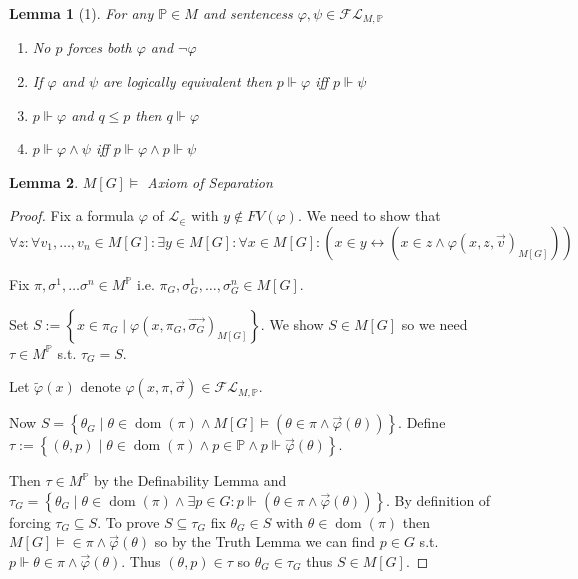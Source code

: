 \documentclass{scrartcl}
\renewcommand{\L}{\mathcal{L}}
\newcommand{\Le}{\L_\in}
\newcommand{\set}[1]{\left\{#1\right\}}
\DeclareMathOperator{\dom}{dom}
\theoremstyle{definition}
\theoremstyle{plain}
\newtheorem*{lemma*}{Lemma}
\theoremstyle{remark}
\begin{document}
	\begin{lemma*}[1]
		For any $\mathbb{P} \in M$ and sentencess  $\varphi, \psi \in \mathcal{FL}_{M, \mathbb{P}}$
		\begin{enumerate}
			\item No $p$ forces both $\varphi$ and $\lnot \varphi$

			\item If $\varphi$ and $\psi$ are logically equivalent then $p \Vdash \varphi$ iff $p \Vdash \psi$
			
			\item $p \Vdash \varphi$ and $q \leq p$ then $q \Vdash \varphi$

			\item $p \Vdash \varphi \land \psi$ iff $p \Vdash \varphi \land p \Vdash \psi$
		\end{enumerate}
	\end{lemma*}

	\begin{lemma*}
		$M[G] \vDash $ Axiom of Separation
	\end{lemma*}

	\begin{proof}
		Fix a formula $\varphi$ of $\Le$ with $y \notin FV(\varphi)$. We need to show that $\forall z: \forall v_1, \dots, v_n \in M[G]: \exists y \in M[G]: \forall x \in M[G]: 
		(x \in y \leftrightarrow (x \in z \land \varphi(x, z, \vec{v})_{M[G]}))$ 

		Fix $\pi, \sigma^1, \dots \sigma^n \in M^\mathbb{P}$  i.e. $\pi_G, \sigma_G^1, \dots, \sigma_G^n \in M[G]$.

		Set $S:= \set{x \in \pi_G \mid \varphi(x, \pi_G, \vec{\sigma_G})_{M[G]}}$. We
		show $S \in M[G]$ so we need $\tau \in M^\mathbb{P}$ s.t. $\tau_G = S$.

		Let $\tilde{\varphi}(x)$ denote  $\varphi(x, \pi, \vec{\sigma}) \in \mathcal{FL}_{M, \mathbb{P}}$.

		Now $S = \set{\theta_G \mid \theta \in \dom(\pi) \land M[G] \vDash (\theta \in \pi
		\land \vec{\varphi}(\theta) ) }$. Define  $\tau := \set{(\theta, p) \mid
		\theta \in \dom(\pi) \land p \in  \mathbb{P} \land p \Vdash \vec{\varphi}(\theta)}$.

		Then $\tau \in M^\mathbb{P}$  by the Definability Lemma and
		$\tau_G = \set{\theta_G \mid \theta \in \dom(\pi) \land \exists p \in G: p
		\Vdash (\theta \in \pi \land \vec{\varphi}(\theta))}$.
		By definition of forcing $\tau_G \subseteq S$. To prove $S \subseteq \tau_G$
		fix $\theta_G \in S$ with $\theta \in \dom(\pi)$ then $M[G] \vDash \in \pi 
		\land \vec{\varphi}(\theta)$ so by the Truth Lemma we can find $p \in G$
		s.t. $p \Vdash \theta \in \pi \land \vec{\varphi}(\theta)$. Thus
		$(\theta, p) \in \tau$ so $\theta_G \in \tau_G$ thus $S \in M[G]$.
	\end{proof}
\end{document}
